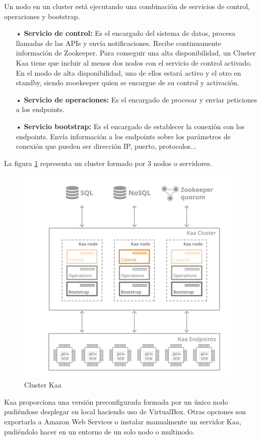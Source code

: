 \documentclass[12pt, twoside]{book}
\begin{document}
Un nodo en un cluster está ejecutando una combinación de servicios de control, operaciones y bootstrap.
\begin{itemize}
\item[•] \textbf{Servicio de control: }Es el encargado del sistema de datos, procesa llamadas de las APIs y envía notificaciones. Recibe continuamente información de Zookeeper. Para conseguir una alta disponibilidad, un Cluster Kaa tiene que incluir al menos dos nodos con el servicio de control activado. En el modo de alta disponibilidad, uno de ellos estará activo y el otro en standby, siendo zooekeeper quien se encargue de su control y activación.\\
\item[•]\textbf{Servicio de operaciones: }Es el encargado de procesar y enviar peticiones a los endpoints.\\
\item[•]\textbf{Servicio bootstrap: } Es el encargado de establecer la conexión con los endpoints. Envía información a los endpoints sobre los parámetros de conexión que pueden ser dirección IP, puerto, protocolos...
\end{itemize}
La figura \ref{cluster:kaa} representa un cluster formado por 3 nodos o servidores.
\begin{figure}[H]
\centering
\includegraphics[scale=0.6]{images/arquitectura_kaa}
\caption{Cluster Kaa}\label{cluster:kaa}
\end{figure}
Kaa proporciona una versión preconfigurada formada por un único nodo pudiéndose desplegar en local haciendo uso de VirtualBox. Otras opciones son exportarla a Amazon Web Services o instalar manualmente un servidor Kaa, pudiéndolo hacer en un entorno de un solo nodo o multinodo.\\
\end{document}
